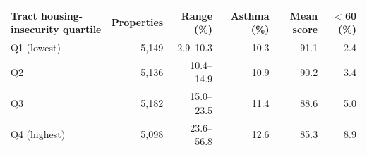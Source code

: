 \begin{tabular}{lrrrrr}
\toprule
Tract housing-insecurity quartile & Properties & Range (\%) & Asthma (\%) & Mean score & $<$60 (\%) \\
\midrule
Q1 (lowest) & 5,149 & 2.9--10.3 & 10.3 & 91.1 & 2.4 \\
Q2 & 5,136 & 10.4--14.9 & 10.9 & 90.2 & 3.4 \\
Q3 & 5,182 & 15.0--23.5 & 11.4 & 88.6 & 5.0 \\
Q4 (highest) & 5,098 & 23.6--56.8 & 12.6 & 85.3 & 8.9 \\
\bottomrule
\end{tabular}
